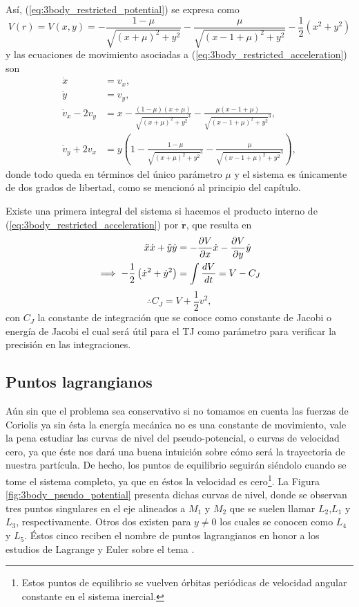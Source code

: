 Así, (\ref{eq:3body_restricted_potential}) se expresa como
\begin{equation}
 V(r) = V(x,y) = -\frac{1 - \mu}{\sqrt{(x + \mu)^2 + y^2}} -  \frac{\mu}{\sqrt{(x - 1 + \mu)^2 + y^2}} - \frac{1}{2} \left(x^2 + y^2 \right)
\end{equation}
y las ecuaciones de movimiento asociadas a (\ref{eq:3body_restricted_acceleration}) son
\begin{align}
 \dot{x} &= v_x, \\
 \dot{y} &= v_y, \\
 \dot{v}_x - 2v_y &=  x - \frac{(1 - \mu) (x+\mu)}{\sqrt{ (x+\mu)^2 + y^2 }^3} - \frac{\mu (x - 1 + \mu) }{\sqrt{(x - 1 +  \mu)^2 + y^2}^3 }, \\ 
 \dot{v}_y + 2v_x &= y \left( 1 - \frac{ 1 - \mu }{\sqrt{(x+\mu)^2 + y^2}^3} - \frac{\mu}{\sqrt{(x - 1 + \mu)^2 + y^2}^3} \right),
 \label{eq:3body_restricted_ eqs_motion}
\end{align}
donde todo queda en términos del único parámetro $\mu$ y el sistema es únicamente de dos grados de libertad, como se mencionó al principio del capítulo. 

Existe una primera integral del sistema si hacemos el producto interno de (\ref{eq:3body_restricted_acceleration}) por $\dot{\mathbf{r}}$, que resulta en 
\begin{align*}
 \ddot{x} \dot{x} + \ddot{y} \dot{y} &= - \frac{\partial V}{\partial x}\dot{x} - \frac{\partial V}{\partial y} \dot{y} \\
 \implies - \frac{1}{2} \left( \dot{x}^2 + \dot{y}^2 \right) &= \int \frac{d V}{dt} = V - C_J 
\end{align*}
\begin{equation}
 \therefore C_J = V + \frac{1}{2}v^2,
 \label{eq:3body_jacobi_constant}
\end{equation}
con $C_J$ la constante de integración que se conoce como constante de Jacobi o energía de Jacobi el cual será útil para el TJ como parámetro para verificar la precisión en las integraciones.

\subsection{Puntos lagrangianos}
\label{sec:lag_points}

Aún sin que el problema sea conservativo si no tomamos en cuenta las fuerzas de Coriolis ya sin ésta la energía mecánica no es una constante de movimiento, vale la pena estudiar las curvas de nivel del pseudo-potencial, o curvas de velocidad cero, ya que éste nos dará una buena intuición sobre cómo será la trayectoria de nuestra partícula. De hecho, los puntos de equilibrio seguirán siéndolo cuando se tome el sistema completo, ya que en éstos la velocidad es cero\footnote{Estos puntos de equilibrio se vuelven órbitas periódicas de velocidad angular constante en el sistema inercial.}. La Figura \ref{fig:3body_pseudo_potential} presenta dichas curvas de nivel, donde se observan tres puntos singulares en el eje alineados a $M_1$ y $M_2$ que se suelen llamar $L_2$,$L_1$ y $L_3$, respectivamente. Otros dos existen para $y \neq 0$ los cuales se conocen como $L_4$ y $L_5$. Éstos cinco reciben el nombre de puntos lagrangianos en honor a los estudios de Lagrange y Euler sobre el tema \cite{Lagrange1867 , Euler1736}.


